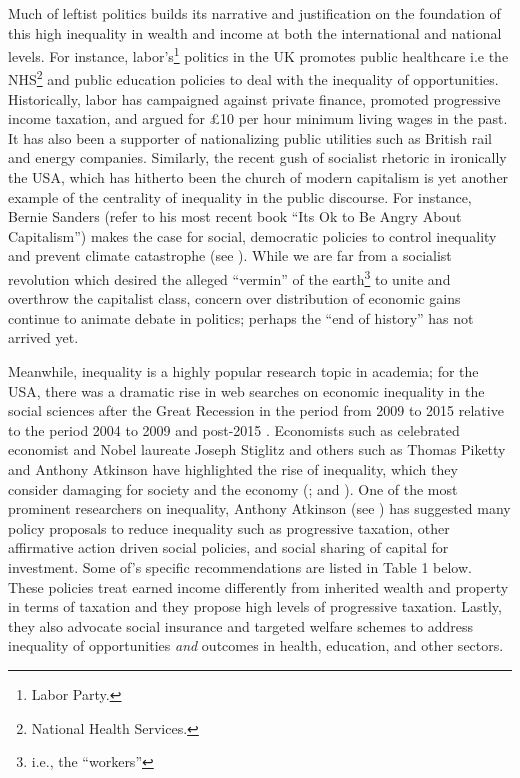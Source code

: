 \documentclass[12pt]{article}
\newcommand{\1}{\mathbbm 1}
\begin{document}
		Much of leftist politics builds its narrative and justification on the foundation of this high inequality in wealth and income at both the international and national levels. For instance, labor's\footnote{Labor Party.} politics in the UK promotes public healthcare i.e the NHS\footnote{National Health Services.} and public education policies to deal with the inequality of opportunities. Historically, labor has campaigned against private finance, promoted progressive income taxation, and argued for \pounds 10 per hour minimum living wages in the past. It has also been a supporter of nationalizing public utilities such as British rail and energy companies. Similarly, the recent gush of socialist rhetoric in ironically the USA, which has hitherto been the church of modern capitalism is yet another example of the centrality of inequality in the public discourse. For instance, Bernie Sanders (refer to his most recent book ``Its Ok to Be Angry About Capitalism'') makes the case for social, democratic policies to control inequality and prevent climate catastrophe (see \cite{sanders2023}). While we are far from a socialist revolution which desired the alleged ``vermin'' of the earth\footnote{i.e., the ``workers''} to unite and overthrow the capitalist class, concern over distribution of economic gains continue to animate debate in politics; perhaps the ``end of history'' has not arrived yet.
		
		
		Meanwhile, inequality is a highly popular research topic in academia; for the USA, there was a dramatic rise in web searches on economic inequality in the social sciences after the Great Recession in the period from 2009 to 2015 relative to the period 2004 to 2009 and post-2015 \cite{googletrendsinequality}. Economists such as celebrated economist and Nobel laureate Joseph Stiglitz and others such as Thomas Piketty and Anthony Atkinson have highlighted the rise of inequality, which they consider damaging for society and the economy (\cite{stiglitz2012}; \cite{piketty2017capital} and \cite{piketty2022brief}). One of the most prominent researchers on inequality, Anthony Atkinson (see \cite{atkinson2015inequality}) has suggested many policy proposals to reduce inequality such as progressive taxation, other affirmative action driven social policies, and  social sharing  of  capital for investment. Some of\cite{atkinson2015inequality}'s specific recommendations are listed in Table 1 below. These policies treat earned income differently from inherited wealth and property in terms of taxation and they propose high levels of progressive taxation. Lastly, they also advocate social insurance and targeted welfare schemes to address inequality of opportunities \textit{and} outcomes in health, education, and other sectors.
		
\end{document}
